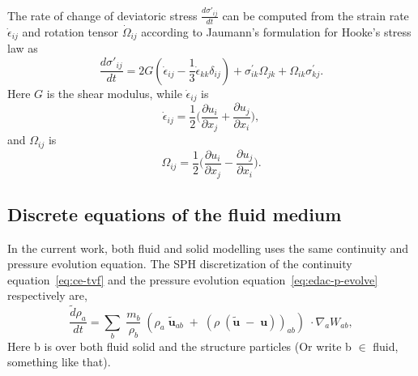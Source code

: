 \documentclass[10pt, conference]{FMFP2022}
\newcommand{\ten}[1]{\ensuremath{\mathbf{#1}}}
\begin{document}
The rate of change of deviatoric stress $\frac{d \sigma'_{ij}}{dt}$ can be
computed from the strain rate $\dot{\epsilon}_{ij}$ and rotation tensor
$\dot{\Omega}_{ij}$ according to Jaumann's formulation for Hooke's stress law
as
\begin{equation}
  \label{eq:jaumann-stress-rate}
  \frac{d \sigma'_{ij}}{dt} = 2G (\dot{\epsilon}_{ij} - \frac{1}{3}
  \dot{\epsilon}_{kk} \delta_{ij}) + \sigma^{'}_{ik}  \Omega_{jk} +
  \Omega_{ik} \sigma^{'}_{kj}.
\end{equation}
Here $G$ is the shear modulus, while $\dot{\epsilon}_{ij}$ is
\begin{equation}
  \label{eq:strain-tensor}
  \dot{\epsilon}_{ij} = \frac{1}{2} \bigg(\frac{\partial u_i}{\partial x_j} +
  \frac{\partial u_j}{\partial x_i} \bigg),
\end{equation}
and $\Omega_{ij}$ is
\begin{equation}
  \label{eq:rotational-tensor}
  \Omega_{ij} = \frac{1}{2} \bigg(\frac{\partial u_i}{\partial x_j} -
  \frac{\partial u_j}{\partial x_i} \bigg).
\end{equation}


\subsection{\textbf{Discrete equations of the fluid medium}}\label{subsec:discrete-fluid}

In the current work, both fluid and solid modelling uses the same continuity
and pressure evolution equation. The SPH discretization of the continuity
equation~\eqref{eq:ce-tvf} and the pressure evolution
equation~\eqref{eq:edac-p-evolve} respectively are,
\begin{equation}
  \label{eq:sph-discretization-continuity}
  \frac{\tilde{d}\rho_a}{dt} = \sum_{b} \; \frac{m_b}{\rho_{b}} \; (
  \rho_{a} \; \tilde{\ten{u}}_{ab} \; + \;
  (\rho \; (\tilde{\ten{u}} \; - \;
  \ten{u}))_{ab}) \; \cdot \nabla_{a} W_{ab},
\end{equation}
Here b is over both fluid solid and the structure particles (Or write b $\in$
fluid, something like that).
\end{document}

